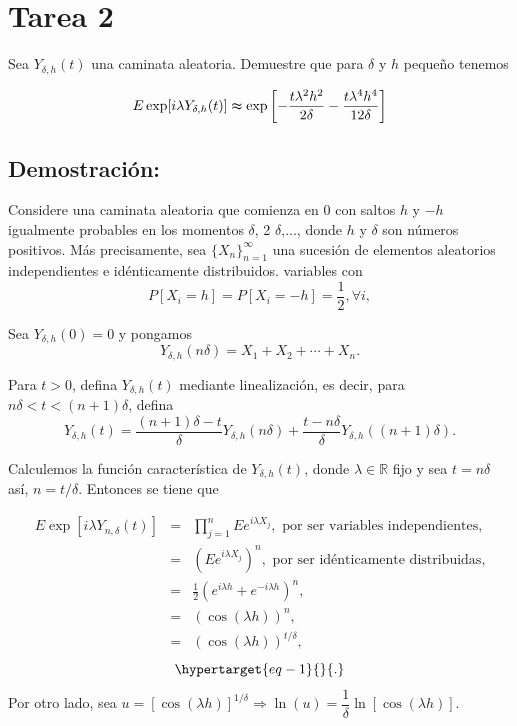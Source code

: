 \documentclass[
  letterpaper,
  DIV=11,
  numbers=noendperiod]{scrreprt}
\theoremstyle{definition}
\theoremstyle{plain}
\theoremstyle{remark}
\begin{document}

\hypertarget{tarea-2}{%
\chapter{Tarea 2}\label{tarea-2}}

Sea \(Y_{\delta,h}(t)\) una caminata aleatoria. Demuestre que para
\(\delta\) y \(h\) pequeño tenemos

\[
E\exp[i\lambda Y_{\delta,h}(t)]\thickapprox\exp\left[-\frac{t\lambda^{2}h^{2}}{2\delta}-\frac{t\lambda^{4}h^{4}}{12\delta}\right]
\]

\hypertarget{demostraciuxf3n}{%
\section*{Demostración:}\label{demostraciuxf3n}}


Considere una caminata aleatoria que comienza en 0 con saltos \(h\) y
\(-h\) igualmente probables en los momentos \(\delta\), 2
\(\delta\),\(\dots\), donde \(h\) y \(\delta\) son números positivos.
Más precisamente, sea \(\{X_{n}\}_{n=1}^{\infty}\) una sucesión de
elementos aleatorios independientes e idénticamente distribuidos.
variables con \[
P\left[X_{i}=h\right]=P\left[X_{i}=-h\right]=\dfrac{1}{2},\forall i,
\]

Sea \(Y_{\delta,h}(0)=0\) y pongamos \[
Y_{\delta,h}(n\delta)=X_{1}+X_{2}+\cdots+X_{n}.
\]

Para \(t>0\), defina \(Y_{\delta,h}(t)\) mediante linealización, es
decir, para \(n\delta<t<(n + 1)\delta\), defina \[
Y_{\delta,h}(t)=\frac{(n+1)\delta-t}{\delta}Y_{\delta,h}(n\delta)+\frac{t-n\delta}{\delta}Y_{\delta,h}((n+1)\delta).
\]

Calculemos la función característica de \(Y_{\delta,h}(t)\), donde
\(\lambda\in\mathbb{R}\) fijo y sea \(t=n\delta\) así, \(n=t/\delta\).
Entonces se tiene que

\begin{eqnarray}
    E\exp\left[i\lambda Y_{n,\delta}\left(t\right)\right] & = & \prod_{j=1}^{n}Ee^{i\lambda X_{j}},\text{ por ser variables independientes,}\nonumber\\
    & = & (Ee^{i\lambda X_{j}})^{n},\text{ por ser idénticamente distribuidas,}\nonumber\\
    & = & \frac{1}{2}(e^{i\lambda h}+e^{-i\lambda h})^{n},\nonumber\\
    & = & (\cos(\lambda h))^{n},\nonumber\\
    & = & (\cos(\lambda h))^{t/\delta},
\end{eqnarray} \begin{equation}\protect\hypertarget{eq-1}{}{
.
}\label{eq-1}\end{equation} Por otro lado, sea
\(u=\left[\cos\left(\lambda h\right)\right]^{1/\delta}\Rightarrow\ln\left(u\right)=\dfrac{1}{\delta}\ln\left[\cos\left(\lambda h\right)\right]\).
\end{document}
